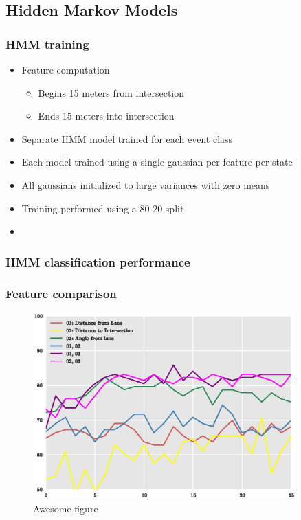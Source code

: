 \documentclass{beamer}
\begin{document}
\subsection[HMM]{Hidden Markov Models}
\begin{frame}
\frametitle{HMM training}
	\begin{itemize}
	  \item Feature computation
	  \begin{itemize}
	    \item Begins 15 meters from intersection
	    \item Ends 15 meters into intersection
	   \end{itemize}
	   \item Separate HMM model trained for each event class
	   \item Each model trained using a single gaussian per feature per state
	   \item All gaussians initialized to large variances with zero means
	   \item Training performed using a 80-20 split
	  \item  
	\end{itemize}
\end{frame}

\begin{frame}

\frametitle{HMM classification performance}

\end{frame}

\begin{frame}

\frametitle{Feature comparison}
 	\begin{figure}
 		\centering
    	\includegraphics[width =
    	0.9\textwidth]{./presentation_files/feature_comparison.eps}
    	\caption{Awesome figure}
	\end{figure}

\end{frame}
\end{document}
